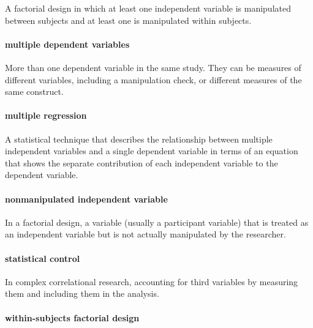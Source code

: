 \documentclass[
]{krantz}
\begin{document}
A factorial design in which at least one independent variable is manipulated between subjects and at least one is manipulated within subjects.

\hypertarget{multiple-dependent-variables-1}{%
\paragraph*{multiple dependent variables}\label{multiple-dependent-variables-1}}

More than one dependent variable in the same study. They can be measures of different variables, including a manipulation check, or different measures of the same construct.

\hypertarget{multiple-regression}{%
\paragraph*{multiple regression}\label{multiple-regression}}

A statistical technique that describes the relationship between multiple independent variables and a single dependent variable in terms of an equation that shows the separate contribution of each independent variable to the dependent variable.

\hypertarget{nonmanipulated-independent-variable}{%
\paragraph*{nonmanipulated independent variable}\label{nonmanipulated-independent-variable}}

In a factorial design, a variable (usually a participant variable) that is treated as an independent variable but is not actually manipulated by the researcher.

\hypertarget{statistical-control}{%
\paragraph*{statistical control}\label{statistical-control}}

In complex correlational research, accounting for third variables by measuring them and including them in the analysis.

\hypertarget{within-subjects-factorial-design}{%
\paragraph*{within-subjects factorial design}\label{within-subjects-factorial-design}}
\end{document}
